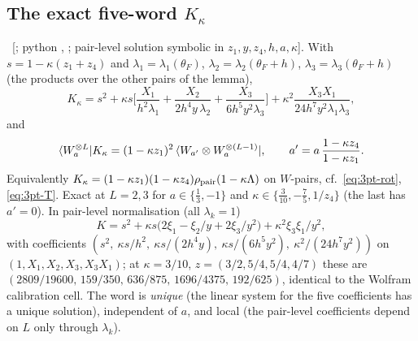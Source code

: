\subsection{The exact five-word $K_\kappa$}\label{sec:kappa-word}

\ex\ [; python , ; pair-level solution symbolic in $z_1,y,z_4,h,a,\kappa$]. With $s=1-\kappa(z_1+z_4)$ and
$\lambda_1=\lambda_1(\theta_F)$, $\lambda_2=\lambda_2(\theta_F+h)$, $\lambda_3=\lambda_3(\theta_F+h)$ (the products over the other pairs of the lemma),
\begin{equation}\label{eq:kappa-K}
 K_\kappa=s^2+\kappa s\Big[\frac{X_1}{h^2\lambda_1}+\frac{X_2}{2h^4y\,\lambda_2}+\frac{X_3}{6h^5y^2\lambda_3}\Big]+\kappa^2\frac{X_3X_1}{24h^7y^2\lambda_1\lambda_3},
\end{equation}
and
\begin{equation}\label{eq:kappa-main}
 \langle W_a^{\otimes L}|K_\kappa=(1-\kappa z_1)^2\,\langle W_{a'}\otimes W_a^{\otimes(L-1)}|,\qquad a'=a\,\frac{1-\kappa z_4}{1-\kappa z_1}.
\end{equation}
Equivalently $K_\kappa=(1-\kappa z_1)(1-\kappa z_4)\rho_{\rm pair}(1-\kappa\Lambda)$ on $W$-pairs, cf.\ \eqref{eq:3pt-rot}, \eqref{eq:3pt-T}. Exact at $L=2,3$ for $a\in\{\tfrac13,-1\}$ and
$\kappa\in\{\tfrac3{10},-\tfrac75,1/z_4\}$ (the last has $a'=0$). In pair-level normalisation (all $\lambda_k=1$)
\begin{equation}
 K=s^2+\kappa s\big(2\xi_1-\xi_2/y+2\xi_3/y^2\big)+\kappa^2\xi_3\xi_1/y^2 ,
\end{equation}
with coefficients $(s^2,\ \kappa s/h^2,\ \kappa s/(2h^4y),\ \kappa s/(6h^5y^2),\ \kappa^2/(24h^7y^2))$ on $(1,X_1,X_2,X_3,X_3X_1)$; at $\kappa=3/10$, $z=(3/2,5/4,5/4,4/7)$ these are
$(2809/19600,\,159/350,\,636/875,\,1696/4375,\,192/625)$, identical to the Wolfram calibration cell. The word is \emph{unique} (the linear system for the five coefficients has a unique solution), independent of $a$, and local
(the pair-level coefficients depend on $L$ only through $\lambda_k$).


